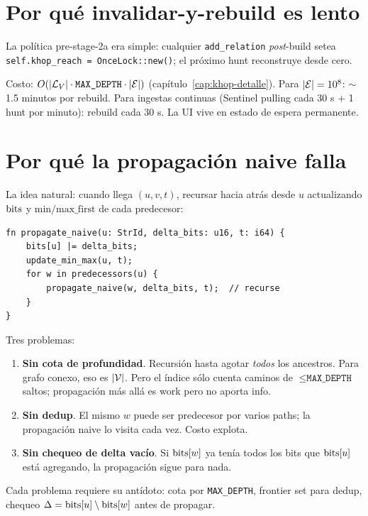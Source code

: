 \section{Por qué invalidar-y-rebuild es lento}

La política pre-stage-2a era simple: cualquier
\texttt{add\_relation} \emph{post}-build setea
\texttt{self.khop\_reach = OnceLock::new()}; el próximo hunt
reconstruye desde cero.

Costo: \(O(|\mathcal{L}_V| \cdot \texttt{MAX\_DEPTH} \cdot |\mathcal{E}|)\)
(capítulo~\ref{cap:khop-detalle}). Para \(|\mathcal{E}| = 10^8\): $\sim$1.5
minutos por rebuild. Para ingestas continuas (Sentinel pulling
cada 30 s + 1 hunt por minuto): rebuild cada 30 s. La UI vive en
estado de espera permanente.

\section{Por qué la propagación naive falla}

La idea natural: cuando llega \((u, v, t)\), recursar hacia atrás
desde \(u\) actualizando \(\mathrm{bits}\) y \(\mathrm{min/max\_first}\)
de cada predecesor:

\begin{lstlisting}
fn propagate_naive(u: StrId, delta_bits: u16, t: i64) {
    bits[u] |= delta_bits;
    update_min_max(u, t);
    for w in predecessors(u) {
        propagate_naive(w, delta_bits, t);  // recurse
    }
}
\end{lstlisting}

Tres problemas:

\begin{enumerate}
    \item \textbf{Sin cota de profundidad}. Recursión hasta agotar
    \emph{todos} los ancestros. Para grafo conexo, eso es \(|\mathcal{V}|\).
    Pero el índice sólo cuenta caminos de \(\leq \texttt{MAX\_DEPTH}\)
    saltos; propagación más allá es work pero no aporta info.
    \item \textbf{Sin dedup}. El mismo \(w\) puede ser predecesor
    por varios paths; la propagación naive lo visita cada vez. Costo
    explota.
    \item \textbf{Sin chequeo de delta vacío}. Si \(\mathrm{bits}[w]\) ya
    tenía todos los bits que \(\mathrm{bits}[u]\) está agregando, la
    propagación sigue para nada.
\end{enumerate}

\noindent
Cada problema requiere su antídoto: cota por
\texttt{MAX\_DEPTH}, frontier set para dedup, chequeo
\(\Delta = \mathrm{bits}[u] \setminus \mathrm{bits}[w]\) antes de propagar.

